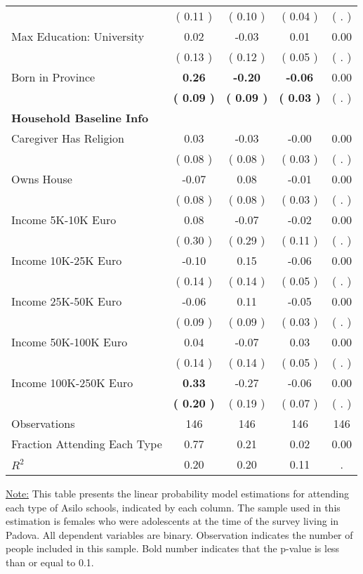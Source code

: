 \begin{table}[H]
{\begin{tabular}{lcccc}
\quad  & (     0.11 ) & (     0.10 )  & (     0.04 )  & (        . )  \\
\quad Max Education: University &      0.02 &     -0.03 &      0.01 &      0.00 \\
\quad  & (     0.13 ) & (     0.12 )  & (     0.05 )  & (        . )  \\
\quad Born in Province & \textbf{     0.26} & \textbf{    -0.20} & \textbf{    -0.06} &      0.00 \\
\quad  & \textbf{(     0.09 )} & \textbf{(     0.09 )}  & \textbf{(     0.03 )}  & (        . )  \\
\midrule
\textbf{Household Baseline Info} \\
\quad Caregiver Has Religion &      0.03 &     -0.03 &     -0.00 &      0.00 \\
\quad  & (     0.08 ) & (     0.08 )  & (     0.03 )  & (        . )  \\
\quad Owns House &     -0.07 &      0.08 &     -0.01 &      0.00 \\
\quad  & (     0.08 ) & (     0.08 )  & (     0.03 )  & (        . )  \\
\quad Income 5K-10K Euro &      0.08 &     -0.07 &     -0.02 &      0.00 \\
\quad  & (     0.30 ) & (     0.29 )  & (     0.11 )  & (        . )  \\
\quad Income 10K-25K Euro &     -0.10 &      0.15 &     -0.06 &      0.00 \\
\quad  & (     0.14 ) & (     0.14 )  & (     0.05 )  & (        . )  \\
\quad Income 25K-50K Euro &     -0.06 &      0.11 &     -0.05 &      0.00 \\
\quad  & (     0.09 ) & (     0.09 )  & (     0.03 )  & (        . )  \\
\quad Income 50K-100K Euro &      0.04 &     -0.07 &      0.03 &      0.00 \\
\quad  & (     0.14 ) & (     0.14 )  & (     0.05 )  & (        . )  \\
\quad Income 100K-250K Euro & \textbf{     0.33} &     -0.27 &     -0.06 &      0.00 \\
\quad  & \textbf{(     0.20 )} & (     0.19 )  & (     0.07 )  & (        . )  \\
\midrule
Observations & 146 & 146 & 146 & 146 \\
Fraction Attending Each Type &      0.77 &      0.21 &      0.02 &      0.00 \\
\midrule
$ R^2$ &      0.20 &      0.20 &      0.11 &         . \\
\bottomrule
\end{tabular}}
\end{table}
\begin{footnotesize}
\noindent\underline{Note:} This table presents the linear probability model estimations for attending each type of Asilo schools, indicated by each column. The sample used in this estimation is females who were adolescents at the time of the survey living in Padova. All dependent variables are binary. Observation indicates the number of people included in this sample. Bold number indicates that the p-value is less than or equal to 0.1.
\end{footnotesize}
